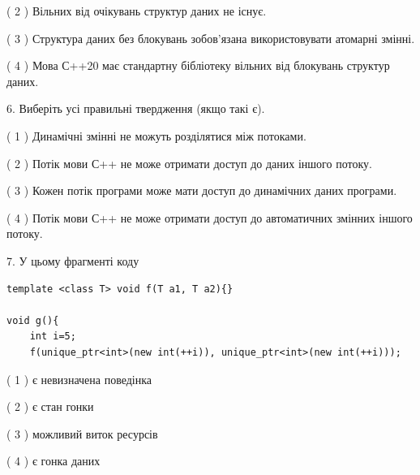 \documentclass[12pt, ukrainian]{article}
\begin{document}
\begin {large}
{( 2 ) Вільних від очікувань структур даних не існує.%

( 3 ) Структура даних без блокувань зобов’язана використовувати атомарні змінні.%

( 4 ) Мова С++20 має стандартну бібліотеку вільних від блокувань структур даних.%
\newpage



\vspace{5mm}
6. Виберіть усі правильні твердження (якщо такі є).\par
\vspace{2mm}

( 1 ) Динамічні змінні не можуть розділятися між потоками.%

( 2 ) Потік мови С++ не може отримати доступ до даних іншого потоку.%

( 3 ) Кожен потік програми може мати доступ до динамічних даних програми.%

( 4 ) Потік мови С++ не може отримати доступ до автоматичних змінних іншого потоку.%


\vspace{5mm}
7. У цьому фрагменті коду
\begin{verbatim}
template <class T> void f(T a1, T a2){}

void g(){
    int i=5;
    f(unique_ptr<int>(new int(++i)), unique_ptr<int>(new int(++i)));
\end{verbatim}

( 1 ) є невизначена поведінка%

( 2 ) є стан гонки%

( 3 ) можливий виток ресурсів%

( 4 ) є гонка даних%
}
\end {large}
\end{document}
